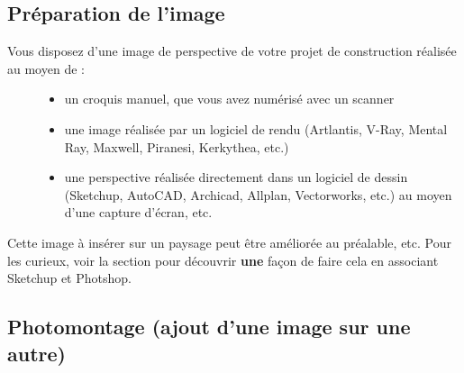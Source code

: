 \documentclass[a4paper,12pt,french]{sphinxmanual}
\begin{document}
\subsection{Préparation de l'image}
\label{psd/insertion:preparation-de-l-image}\begin{description}
\item[{Vous disposez d'une image de perspective de votre projet de construction réalisée au moyen de :}] \leavevmode\begin{itemize}
\item {} 
un croquis manuel, que vous avez numérisé avec un scanner

\item {} 
une image réalisée par un logiciel de rendu (Artlantis, V-Ray, Mental Ray, Maxwell, Piranesi, Kerkythea, etc.)

\item {} 
une perspective réalisée directement dans un logiciel de dessin (Sketchup, AutoCAD, Archicad, Allplan, Vectorworks, etc.) au moyen d'une capture d'écran, etc.

\end{itemize}

\end{description}

Cette image à insérer sur un paysage peut être améliorée au préalable, etc. Pour les curieux, voir la section {\hyperref[psd/prepa\string-image_su+psd:prepa\string-image\string-su\string-psd]{}} pour découvrir \textbf{une} façon de faire cela en associant Sketchup et Photshop.


\subsection{Photomontage (ajout d'une image sur une autre)}
\label{psd/insertion:photomontage-ajout-d-une-image-sur-une-autre}
\end{document}

